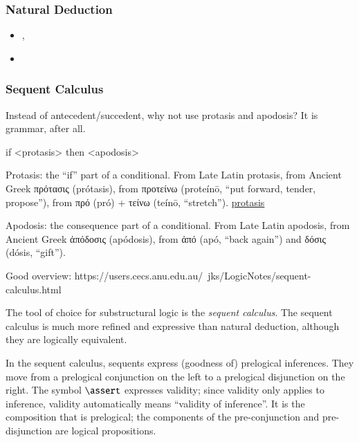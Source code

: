 \subsubsection{Natural Deduction}


\begin{itemize}
\item {}, \cite{Prawitz1965-PRANDA}
\item {} \cite{Gentzen1964-nat-deduc}
\end{itemize}


\subsubsection{Sequent Calculus}

Instead of antecedent/succedent, why not use protasis and apodosis? It
is grammar, after all.

if <protasis> then <apodosis>

Protasis: the ``if'' part of a conditional. From Late Latin protasis,
from Ancient Greek πρότασις (prótasis), from προτείνω (proteínō, “put
forward, tender, propose”), from πρό (pró) + τείνω (teínō, “stretch”).
\href{https://en.wiktionary.org/wiki/protasis}{protasis}

Apodosis: the consequence part of a conditional. From Late Latin
apodosis, from Ancient Greek ἀπόδοσις (apódosis), from ἀπό (apó, “back
again”) and δόσις (dósis, “gift”).

Good overview:
https://users.cecs.anu.edu.au/~jks/LogicNotes/sequent-calculus.html


The tool of choice for substructural logic is the \textit{sequent
  calculus}. The sequent calculus is much more refined and expressive
than natural deduction, although they are logically equivalent.

In the sequent calculus, sequents express (goodness of) prelogical
inferences. They move from a prelogical conjunction on the left to a
prelogical disjunction on the right. The symbol \(\linfer\) expresses
validity; since validity only applies to inference, validity
automatically means ``validity of inference''. It is the composition
that is prelogical; the components of the pre-conjunction and
pre-disjunction are logical propositions.

